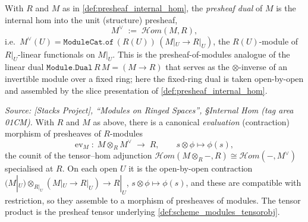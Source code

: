 \begin{definition}\leanok
  \label{def:presheaf_dual}
  With \(R\) and \(M\) as in \cref{def:presheaf_internal_hom}, the
  \emph{presheaf dual} of \(M\) is the internal hom into the unit (structure)
  presheaf,
  \[
    M^\vee \;:=\; \mathcal{H}om(M, R),
  \]
  i.e.\ \(M^\vee(U) = \mathtt{ModuleCat.of}\,(R(U))\,(M|_U \to R|_U)\), the
  \(R(U)\)-module of \(R|_U\)-linear functionals on \(M|_U\). This is the
  presheaf-of-modules analogue of the linear dual
  \(\mathtt{Module.Dual}\,R\,M = (M \to R)\) that serves as the \(\otimes\)-inverse of
  an invertible module over a fixed ring; here the fixed-ring dual is taken
  open-by-open and assembled by the slice presentation of
  \cref{def:presheaf_internal_hom}.
\end{definition}

\begin{lemma}\leanok
  \label{lem:internal_hom_eval}
  \textit{Source: [Stacks Project], ``Modules on Ringed Spaces'', \S Internal Hom
  (tag area 01CM).}
  With \(R\) and \(M\) as above, there is a canonical \emph{evaluation} (contraction)
  morphism of presheaves of \(R\)-modules
  \[
    \mathrm{ev}_M \;\colon\; M \otimes_R M^\vee \;\longrightarrow\; R,
    \qquad s \otimes \phi \longmapsto \phi(s),
  \]
  the counit of the tensor--hom adjunction
  \(\mathcal{H}om(M \otimes_R -, R) \cong \mathcal{H}om(-, M^\vee)\) specialised at
  \(R\). On each open \(U\) it is the open-by-open contraction
  \((M|_U) \otimes_{R|_U} (M|_U \to R|_U) \to R|_U\), \(s \otimes \phi \mapsto
  \phi(s)\), and these are compatible with restriction, so they assemble to a morphism
  of presheaves of modules. The tensor product is the presheaf tensor underlying
  \cref{def:scheme_modules_tensorobj}.
\end{lemma}

